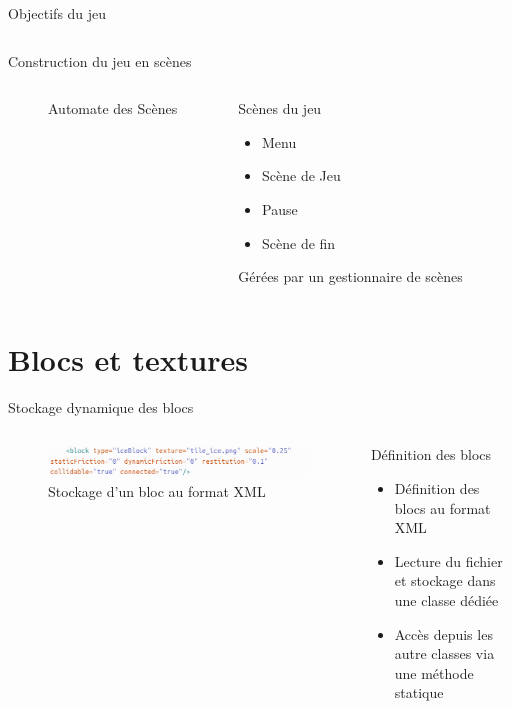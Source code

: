 \documentclass{beamer}
\begin{document}
{\begin{frame}{Objectifs du jeu}
\begin{columns}
    \end{columns}
\end{frame}

\begin{frame}{Construction du jeu en scènes}
    \begin{columns}
            \begin{figure}
                \centering
                
                \caption{Automate des Scènes}
            \end{figure}
            \begin{block}{Scènes du jeu}
                \begin{itemize}
                    \item[\bullet] Menu
                    \item[\bullet] Scène de Jeu
                    \item[\bullet] Pause
                    \item[\bullet] Scène de fin
                \end{itemize}
                Gérées par un gestionnaire de scènes
            \end{block}
    \end{columns}
\end{frame}

\section{Blocs et textures}
\begin{frame}{Stockage dynamique des blocs}
    \begin{columns}
            \begin{figure}
                \centering
                \includegraphics[width=1.0\textwidth]{images/XMLfile}
                \caption{Stockage d'un bloc au format XML}
            \end{figure}
            \begin{block}{Définition des blocs}
                \begin{itemize}
                    \item[\bullet] Définition des blocs au format XML
                    \item[\bullet] Lecture du fichier et stockage dans une classe dédiée
                    \item[\bullet] Accès depuis les autre classes via une méthode statique
                \end{itemize}
            \end{block}
    \end{columns}
\end{frame}

}
\end{document}

